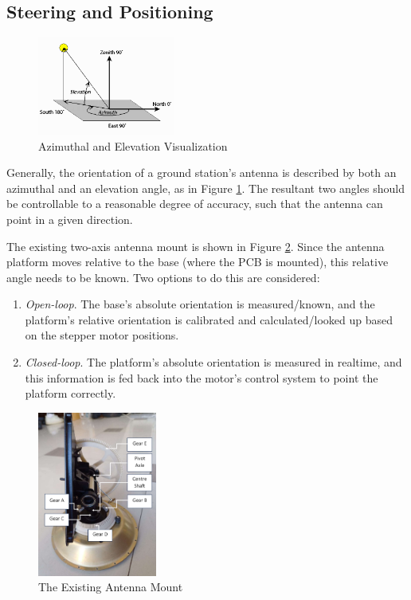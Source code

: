 \subsection{Steering and Positioning}\label{sec:gs_steering_positioning}
\begin{figure}[!htb]
    \centering
    \includegraphics[width=0.4\textwidth]{az_elevation}
    \caption{Azimuthal and Elevation Visualization \cite{site-azElevationVisual}}
    \label{fig:az_elevation}
\end{figure}

Generally, the orientation of a ground station's antenna is described by both an azimuthal and an elevation angle, as in Figure \ref{fig:az_elevation}. The resultant two angles should be controllable to a reasonable degree of accuracy, such that the antenna can point in a given direction.

The existing two-axis antenna mount is shown in Figure \ref{fig:antennaMount}. Since the antenna platform moves relative to the base (where the PCB is mounted), this relative angle needs to be known. Two options to do this are considered:
\begin{enumerate}
    \item \textit{Open-loop}. The base's absolute orientation is measured/known, and the platform's relative orientation is calibrated and calculated/looked up based on the stepper motor positions.
    \item \textit{Closed-loop}. The platform's absolute orientation is measured in realtime, and this information is fed back into the motor's control system to point the platform correctly.
\end{enumerate}

\begin{figure}[!htb]
    \centering
    \includegraphics[width=0.35\textwidth]{antennaMount}
    \caption{The Existing Antenna Mount}
    \label{fig:antennaMount}
\end{figure}


